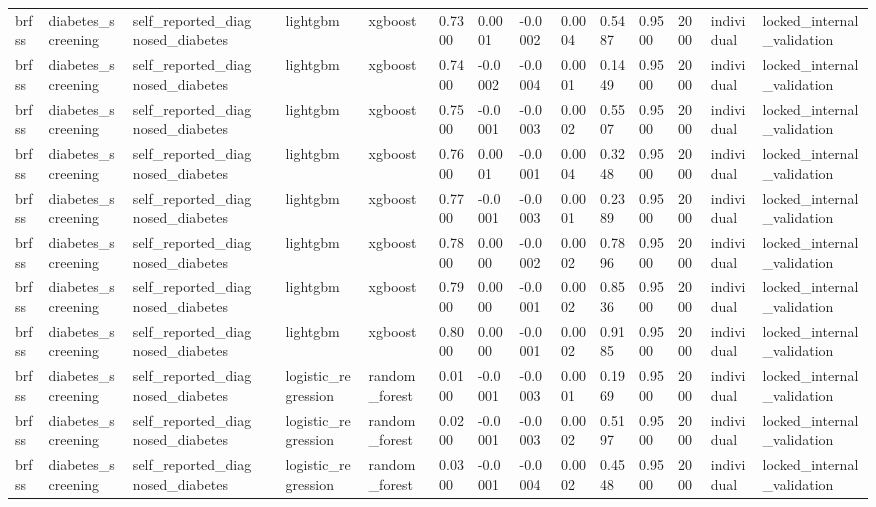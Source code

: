 \begin{tabular}{lllllllllllllll}
brfss & diabetes\_screening & self\_reported\_diagnosed\_diabetes &  & lightgbm & xgboost & 0.7300 & 0.0001 & -0.0002 & 0.0004 & 0.5487 & 0.9500 & 2000 & individual & locked\_internal\_validation \\
brfss & diabetes\_screening & self\_reported\_diagnosed\_diabetes &  & lightgbm & xgboost & 0.7400 & -0.0002 & -0.0004 & 0.0001 & 0.1449 & 0.9500 & 2000 & individual & locked\_internal\_validation \\
brfss & diabetes\_screening & self\_reported\_diagnosed\_diabetes &  & lightgbm & xgboost & 0.7500 & -0.0001 & -0.0003 & 0.0002 & 0.5507 & 0.9500 & 2000 & individual & locked\_internal\_validation \\
brfss & diabetes\_screening & self\_reported\_diagnosed\_diabetes &  & lightgbm & xgboost & 0.7600 & 0.0001 & -0.0001 & 0.0004 & 0.3248 & 0.9500 & 2000 & individual & locked\_internal\_validation \\
brfss & diabetes\_screening & self\_reported\_diagnosed\_diabetes &  & lightgbm & xgboost & 0.7700 & -0.0001 & -0.0003 & 0.0001 & 0.2389 & 0.9500 & 2000 & individual & locked\_internal\_validation \\
brfss & diabetes\_screening & self\_reported\_diagnosed\_diabetes &  & lightgbm & xgboost & 0.7800 & 0.0000 & -0.0002 & 0.0002 & 0.7896 & 0.9500 & 2000 & individual & locked\_internal\_validation \\
brfss & diabetes\_screening & self\_reported\_diagnosed\_diabetes &  & lightgbm & xgboost & 0.7900 & 0.0000 & -0.0001 & 0.0002 & 0.8536 & 0.9500 & 2000 & individual & locked\_internal\_validation \\
brfss & diabetes\_screening & self\_reported\_diagnosed\_diabetes &  & lightgbm & xgboost & 0.8000 & 0.0000 & -0.0001 & 0.0002 & 0.9185 & 0.9500 & 2000 & individual & locked\_internal\_validation \\
brfss & diabetes\_screening & self\_reported\_diagnosed\_diabetes &  & logistic\_regression & random\_forest & 0.0100 & -0.0001 & -0.0003 & 0.0001 & 0.1969 & 0.9500 & 2000 & individual & locked\_internal\_validation \\
brfss & diabetes\_screening & self\_reported\_diagnosed\_diabetes &  & logistic\_regression & random\_forest & 0.0200 & -0.0001 & -0.0003 & 0.0002 & 0.5197 & 0.9500 & 2000 & individual & locked\_internal\_validation \\
brfss & diabetes\_screening & self\_reported\_diagnosed\_diabetes &  & logistic\_regression & random\_forest & 0.0300 & -0.0001 & -0.0004 & 0.0002 & 0.4548 & 0.9500 & 2000 & individual & locked\_internal\_validation \\

\end{tabular}
